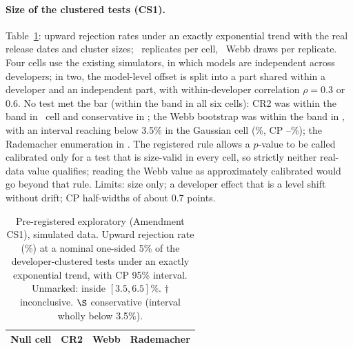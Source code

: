 \documentclass[aps,pre,twocolumn,superscriptaddress,nofootinbib,9pt]{revtex4-2}
\begin{document}
\paragraph*{Size of the clustered tests (CS1).} Table~\ref{tab:cssize}: upward rejection rates under an exactly exponential trend with the real release dates and cluster sizes; \csReps\ replicates per cell, \csWebbB\ Webb draws per replicate. Four cells use the existing simulators, in which models are independent across developers; in two, the model-level offset is split into a part shared within a developer and an independent part, with within-developer correlation $\rho=0.3$ or $0.6$. No test met the bar (within the band in all six cells): CR2 was within the band in \csCrValid\ cell and conservative in \csCrCons; the Webb bootstrap was within the band in \csWebbValid, with an interval reaching below 3.5\% in the Gaussian cell (\csWebbGauss\%, CP \csWebbGaussLo--\csWebbGaussHi\%); the Rademacher enumeration in \csRadValid. The registered rule allows a $p$-value to be called calibrated only for a test that is size-valid in every cell, so strictly neither real-data value qualifies; reading the Webb value as approximately calibrated would go beyond that rule. Limits: size only; a developer effect that is a level shift without drift; CP half-widths of about 0.7 points.

\begin{table}[H]
\caption{Pre-registered exploratory (Amendment CS1), simulated data. Upward rejection rate (\%) at a nominal one-sided 5\% of the developer-clustered tests under an exactly exponential trend, with CP 95\% interval. Unmarked: inside $[3.5,6.5]\%$. $\dagger$ inconclusive. $\S$ conservative (interval wholly below 3.5\%).}
\label{tab:cssize}
\tiny\setlength{\tabcolsep}{1.5pt}
\begin{ruledtabular}
\begin{tabular}{lccc}
Null cell & CR2 & Webb & Rademacher \\
\hline

\end{tabular}
\end{ruledtabular}
\end{table}
\end{document}
